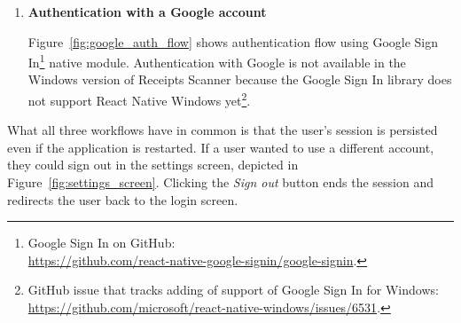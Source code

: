 \documentclass[
  digital, %
  table,   %
  oneside, %
  lof,     %
  lot,     %
]{fithesis3}
\begin{document}
\begin{enumerate}
    \item \textbf{Authentication with a Google account}
    
    \label{phantom:google_sign_in}
    Figure~\ref{fig:google_auth_flow} shows authentication flow using Google Sign In\footnote{Google Sign In on GitHub:\\\url{https://github.com/react-native-google-signin/google-signin}.} native module.
    Authentication with Google is not available in the Windows version of Receipts Scanner because the Google Sign In library does not support React Native Windows yet\footnote{GitHub issue that tracks adding of support of Google Sign In for Windows: \url{https://github.com/microsoft/react-native-windows/issues/6531}.}.

\end{enumerate}

What all three workflows have in common is that the user's session is persisted even if the application is restarted.
If a user wanted to use a different account, they could sign out in the settings screen, depicted in Figure~\ref{fig:settings_screen}. Clicking the \textit{Sign out} button ends the session and redirects the user back to the login screen.
\end{document}
